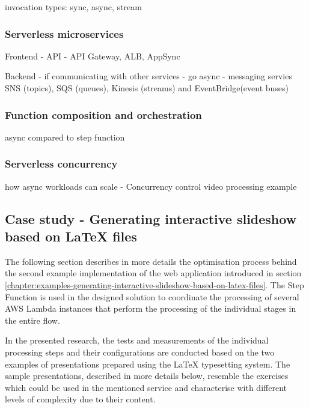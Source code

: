 invocation types: sync, async, stream

\subsubsection{Serverless microservices}

Frontend - API - API Gateway, ALB, AppSync

Backend - if communicating with other services - go async - messaging servies SNS (topics), SQS (queues), Kinesis (streams) and EventBridge(event buses)

\subsubsection{Function composition and orchestration}

async compared to step function

\subsubsection{Serverless concurrency} \label{chapter:serverless-processing-effortless-parallelisation}

how async workloads can scale - Concurrency control
video processing example

\subsection{Case study - Generating interactive slideshow based on LaTeX files} \label{chapter:latex-processing-optimisation}

The following section describes in more details the optimisation process behind the second example implementation of the web application introduced in section \ref{chapter:examples-generating-interactive-slideshow-based-on-latex-files}.
The Step Function is used in the designed solution to coordinate the processing of several AWS Lambda instances that perform the processing of the individual stages in the entire flow.

In the presented research, the tests and measurements of the individual processing steps and their configurations are conducted based on the two examples of presentations prepared using the LaTeX typesetting system.
The sample presentations, described in more details below,  resemble the exercises which could be used in the mentioned service and characterise with different levels of complexity due to their content.

